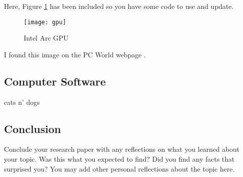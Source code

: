 \documentclass[11pt, twocolumn]{article}
\begin{document}
Here, Figure \ref{fig:gpu} has been included so you have some code to use and update.
\begin{figure}
    \centering
    \texttt{[image: gpu]}
    \caption{Intel Arc GPU}
    \label{fig:gpu}
\end{figure}

I found this image on the PC World webpage \cite{Ung21}. 

\subsection{Computer Software}
cats n' dogs

\subsection{Conclusion}
Conclude your research paper with any reflections on what you learned about your 
topic. Was this what you expected to find? Did you find any facts that surprised you?
You may add other personal reflections about the topic here.



\end{document}
